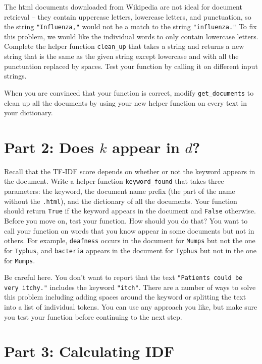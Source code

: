 \documentclass{assignment}
\begin{document}
The html documents downloaded from Wikipedia are not ideal for document retrieval -- they contain
uppercase letters, lowercase letters, and punctuation, so 
the string  \verb|"Influenza,"| would not be a match to the string \verb|"influenza."| To fix this problem,
we would like the individual words to only contain lowercase letters. 
Complete the helper function \verb;clean_up; that takes a string and returns a new string that is the same as the 
given string except lowercase and with all the punctuation replaced by spaces. 
Test your function by calling it on different input strings.

When you are convinced that your function is correct, modify \verb;get_documents; to clean up all the documents by 
using your new helper function on every text in your dictionary.

 

\section*{Part 2: Does $k$ appear in $d$?}

Recall that the TF-IDF score depends on whether or not the keyword appears in the document. 
Write a helper function \verb|keyword_found| that takes three parameters: the keyword, the document name prefix (the part of the name without
the \verb|.html|), and the dictionary of all the documents. Your function should return \verb|True| if the keyword appears in the
document and \verb|False| otherwise. Before you move on, test your function. How should you do that?  You want to call your
function on words that you know appear in some documents but not in others. For example, \verb|deafness| occurs in the 
document for \verb|Mumps| but not the one for \verb|Typhus|, and \verb|bacteria| appears in the document for \verb|Typhus| but not in the one for \verb|Mumps|. 

Be careful here. You don't want to report that the text \verb|"Patients could be very itchy."| includes the keyword \verb|"itch"|.
There are a number of ways to solve this problem including adding spaces around the keyword or splitting the text into a list of individual tokens.
You can use any approach you like, but make sure you test your function before continuing to the next step.

\section*{Part 3: Calculating IDF}
\end{document}
